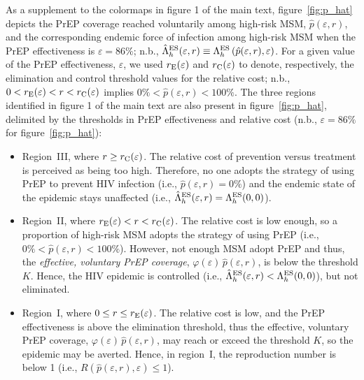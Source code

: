 \documentclass[11pt]{article}
\begin{document}
As a supplement to the colormaps in figure 1 of the main text, figure~\ref{fig:p_hat} depicts the PrEP coverage reached voluntarily among high-risk MSM, $\hat{p}(\varepsilon,r)$, and the corresponding endemic force of infection among high-risk MSM when the PrEP effectiveness is $\varepsilon=86\%$; n.b., $\hat{\Lambda}_h^{\rm ES}(\varepsilon,r) \equiv \Lambda_h^{\rm ES}\left(\hat{p}(\varepsilon,r),\varepsilon\right)$. For a given value of the PrEP effectiveness, $\varepsilon$, we used $r_{\rm E}(\varepsilon)$ and $r_{\rm C}(\varepsilon)$ to denote, respectively, the elimination and control threshold values for the relative cost; n.b.,~$ 0 < r_{\rm E}(\varepsilon) < r < r_{\rm C}(\varepsilon)$ implies $0\%<\hat{p}(\varepsilon,r)<100\%$. The three regions identified in figure 1 of the main text are also present in figure~\ref{fig:p_hat}, delimited by the thresholds in PrEP effectiveness and relative cost (n.b., $\varepsilon=86\%$ for figure~\ref{fig:p_hat}):

\begin{itemize}
\item Region~III, where $r \geq r_{\rm C}(\varepsilon)$. The relative cost of prevention versus treatment is perceived as being too high. Therefore, no one adopts the strategy of using PrEP to prevent HIV infection (i.e., $\hat{p}(\varepsilon,r)=0\%$) and the endemic state of the epidemic stays unaffected (i.e., $\hat{\Lambda}_h^{\rm ES}(\varepsilon,r) = \Lambda_h^{\rm ES}(0,0)$). 

\item Region~II, where $r_{\rm E}(\varepsilon) < r < r_{\rm C}(\varepsilon)$. The relative cost is low enough, so a proportion of high-risk MSM adopts the strategy of using PrEP (i.e., $0 \%< \hat{p}(\varepsilon,r) <100\%$). However, not enough MSM adopt PrEP and thus, the {\it effective, voluntary PrEP coverage}, $\varphi(\varepsilon) \, \hat{p}(\varepsilon,r)$, is below the threshold $K$. Hence, the HIV epidemic is controlled (i.e., $\hat{\Lambda}_h^{\rm ES}(\varepsilon,r) < \Lambda_h^{\rm ES}(0,0)$), but not eliminated. 

\item Region~I, where $0 \leq r\leq r_{\rm E}(\varepsilon)$. The relative cost is low, and the PrEP effectiveness is above the elimination threshold, thus the effective, voluntary PrEP coverage, $\varphi(\varepsilon) \, \hat{p}(\varepsilon,r)$, may reach or exceed the threshold $K$, so the epidemic may be averted. Hence, in region~I, the reproduction number is below 1 (i.e., $R\left(\hat{p}(\varepsilon,r),\varepsilon\right) \leq 1$).
 \end{itemize}
 
\end{document}
